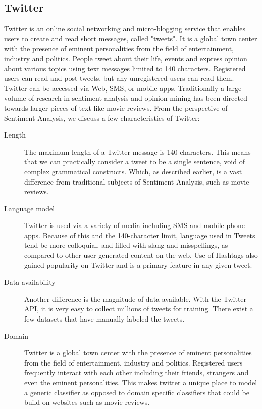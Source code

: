 \subsection{Twitter}
Twitter is an online social networking and micro-blogging service that enables users
	to create and read short messages, called "tweets".
It is a global town center with the presence of eminent personalities from
	the field of entertainment, industry and politics.
People tweet about their life, events and express opinion about various topics
	using text messages limited to 140 characters.
Registered users can read and post tweets, but any unregistered users can read them.
Twitter can be accessed via Web, SMS, or mobile apps.
Traditionally a large volume of research in sentiment analysis and opinion mining
	has been directed towards larger pieces of text like movie reviews.
From the perspective of Sentiment Analysis, we discuss a few characteristics of Twitter:

\begin{description}
\item[Length]{
The maximum length of a Twitter message is 140 characters.
This means that we can practically consider a tweet to be a single sentence,
	void of complex grammatical constructs.
Which, as described earlier, is a vast difference from traditional
	subjects of Sentiment Analysis, such as movie reviews.
}
\item[Language model]{
Twitter is used via a variety of media including SMS and mobile phone apps.
Because of this and the 140-character limit, language used in Tweets tend be more colloquial,
	and filled with slang and misspellings, as compared to other user-generated content on the web.
Use of Hashtags also gained popularity on Twitter and is a primary feature in any given tweet.
}
\item[Data availability]{
Another difference is the magnitude of data available.
With the Twitter API, it is very easy to collect millions of tweets for training.
There exist a few datasets that have manually labeled the tweets.
}
\item[Domain]{
Twitter is a global town center with the presence of eminent personalities from
	the field of entertainment, industry and politics.
Registered users frequently interact with each other including their friends,
	strangers and even the eminent personalities.
This makes twitter a unique place to model a generic classifier as opposed to
	domain specific classifiers that could be build on websites such as movie reviews.
}
\end{description}
